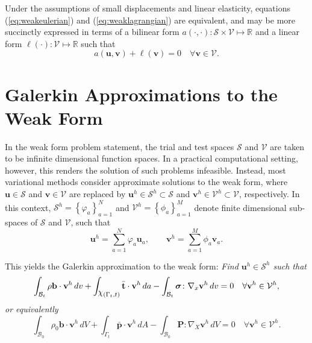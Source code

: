 Under the assumptions of small displacements and linear elasticity, equations (\ref{eq:weakeulerian}) and (\ref{eq:weaklagrangian}) are equivalent, and may be more succinctly expressed in terms of a bilinear form $a(\cdot, \cdot) \colon \mathcal{S} \times \mathcal{V} \mapsto \mathbb{R}$ and a linear form $\ell (\cdot) : \mathcal{V} \mapsto \mathbb{R}$ such that
\begin{equation}
  a(\mathbf{u}, \mathbf{v}) + \ell (\mathbf{v}) = 0 \quad \forall \mathbf{v} \in \mathcal{V}.
\end{equation}


\section{Galerkin Approximations to the Weak Form}

In the weak form problem statement, the trial and test spaces $\mathcal{S}$ and $\mathcal{V}$ are taken to be infinite dimensional function spaces. In a practical computational setting, however, this renders the solution of such problems infeasible. Instead, most variational methods consider approximate solutions to the weak form, where $\mathbf{u} \in \mathcal{S}$ and $\mathbf{v} \in \mathcal{V}$ are replaced by $\mathbf{u}^h \in \mathcal{S}^h \subset \mathcal{S}$ and $\mathbf{v}^h \in \mathcal{V}^h \subset \mathcal{V}$, respectively. In this context, $\mathcal{S}^h = \left\{ \varphi_a \right\}_{a = 1}^{N}$ and $\mathcal{V}^h = \left\{ \phi_a \right\}_{a = 1}^{M}$ denote finite dimensional sub-spaces of $\mathcal{S}$ and $\mathcal{V}$, such that
\begin{equation}
  \mathbf{u}^h = \sum_{a = 1}^N \varphi_a \mathbf{u}_a, \qquad \mathbf{v}^h = \sum_{a = 1}^M \phi_a \mathbf{v}_a.
\end{equation}

This yields the Galerkin approximation to the weak form:
\textit{Find $\mathbf{u}^h \in \mathcal{S}^h$ such that}
\begin{equation}
  \int_{\mathcal{B}_t} \rho \mathbf{b} \cdot \mathbf{v}^h \, dv + \int_{\raisebox{\depth}{$\chi$} (\Gamma_t, t)} \bar{\mathbf{t}} \cdot \mathbf{v}^h \, da - \int_{\mathcal{B}_t} \boldsymbol{\sigma} \colon \nabla_x \mathbf{v}^h \, dv = 0 \quad \forall \mathbf{v}^h \in \mathcal{V}^h,
  \label{eq:approxweakeulerian}
\end{equation}
\textit{or equivalently}
\begin{equation}
  \int_{\mathcal{B}_0} \rho_0 \mathbf{b} \cdot \mathbf{v}^h \, dV + \int_{\Gamma_t} \bar{\mathbf{p}} \cdot \mathbf{v}^h \, dA - \int_{\mathcal{B}_0} \mathbf{P} \colon \nabla_X \mathbf{v}^h \, dV = 0 \quad \forall \mathbf{v}^h \in \mathcal{V}^h.
  \label{eq:approxweaklagrangian}
\end{equation}

